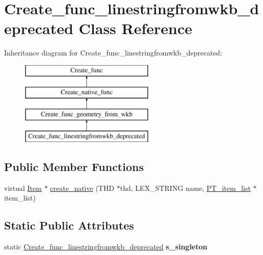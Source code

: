 \hypertarget{classCreate__func__linestringfromwkb__deprecated}{}\section{Create\+\_\+func\+\_\+linestringfromwkb\+\_\+deprecated Class Reference}
\label{classCreate__func__linestringfromwkb__deprecated}
Inheritance diagram for Create\+\_\+func\+\_\+linestringfromwkb\+\_\+deprecated\+:\begin{figure}[H]
\begin{center}
\leavevmode
\includegraphics[height=4.000000cm]{classCreate__func__linestringfromwkb__deprecated}
\end{center}
\end{figure}
\subsection*{Public Member Functions}
\begin{DoxyCompactItemize}
\item 
virtual \mbox{\hyperlink{classItem}{Item}} $\ast$ \mbox{\hyperlink{classCreate__func__linestringfromwkb__deprecated_a56b6284f5656055950fd717336310323}{create\+\_\+native}} (T\+HD $\ast$thd, L\+E\+X\+\_\+\+S\+T\+R\+I\+NG name, \mbox{\hyperlink{classPT__item__list}{P\+T\+\_\+item\+\_\+list}} $\ast$item\+\_\+list)
\end{DoxyCompactItemize}
\subsection*{Static Public Attributes}
\begin{DoxyCompactItemize}
\item 
\mbox{\label{classCreate__func__linestringfromwkb__deprecated_af6d58c9e89b36248a352c5c3ba604f11}} 
static \mbox{\hyperlink{classCreate__func__linestringfromwkb__deprecated}{Create\+\_\+func\+\_\+linestringfromwkb\+\_\+deprecated}} {\bfseries s\+\_\+singleton}
\end{DoxyCompactItemize}
